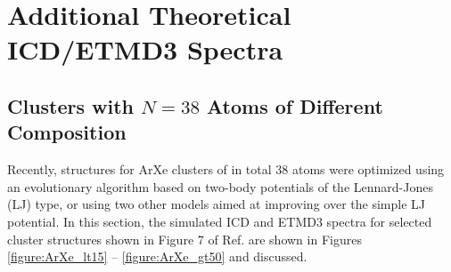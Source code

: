 \section{Additional Theoretical ICD/ETMD3 Spectra}

\subsection{Clusters with $N=38$ Atoms of Different Composition}
Recently, structures for ArXe clusters of in total 38 atoms were optimized
using an evolutionary algorithm based on two-body potentials of the Lennard-Jones (LJ) type, or using two other models aimed at improving over the simple LJ potential.\cite{marques}
In this section, the simulated ICD and ETMD3 spectra for selected cluster
structures shown in Figure 7 of Ref.  are shown in Figures
\ref{figure:ArXe_lt15} -- \ref{figure:ArXe_gt50} and discussed.


